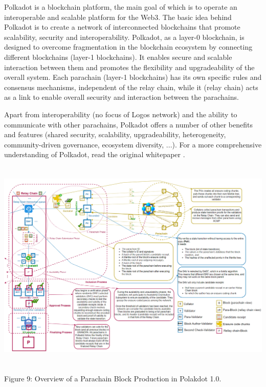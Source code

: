 \documentclass[]{article}
\begin{document}
Polkadot is a blockchain platform, the main goal of which is to operate an interoperable and scalable platform for the Web3.
The basic idea behind Polkadot is to create a network of interconnected blockchains that promote scalability, security and interoperability.
Polkadot, as a layer-0 blockchain, is designed to overcome fragmentation in the blockchain ecosystem by connecting different blockchains (layer-1 blockchains). 
It enables secure and scalable interaction between them and promotes the flexibility and upgradeability of the overall system.
Each parachain \cite{PolkadotDoc-parachain} (layer-1 blockchains) has its own specific rules and consensus mechanisms, independent of the relay chain, while it (relay chain) acts as a link to enable overall security and interaction between the parachains.

Apart from interoperability (no focus of Logos network) and the ability to communicate with other parachains, Polkadot offers a number of other benefits and features (shared security, scalability, upgradeability, heterogeneity, community-driven governance, ecosystem diversity, ...).
For a more comprehensive understanding of Polkadot, read the original whitepaper \cite{Polkadot-whitepaper}.

\begin{center}
	\includegraphics[height=10.2cm]{polkadot-tech-overview}
\end{center}
\begin{center}
	Figure 9: Overview of a Parachain Block Production in Polakdot 1.0. \cite{Parity-book-parachain}
	\newline
\end{center}
\end{document}
